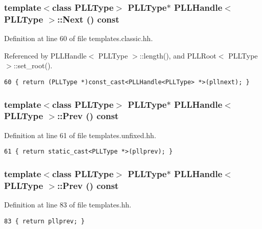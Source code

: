 \subsubsection{\setlength{\rightskip}{0pt plus 5cm}template$<$class PLLType$>$ {\bf PLLType}$\ast$ PLLHandle$<$ {\bf PLLType} $>$::Next () const\hspace{0.3cm}{\tt  [inline]}}\label{classPLLHandle_a1}




Definition at line 60 of file templates.classic.hh.

Referenced by PLLHandle$<$ PLLType $>$::length(), and PLLRoot$<$ PLLType $>$::set\_\-root().



\footnotesize\begin{verbatim}60 { return (PLLType *)const_cast<PLLHandle<PLLType> *>(pllnext); } 
\end{verbatim}\normalsize 
{}
\subsubsection{\setlength{\rightskip}{0pt plus 5cm}template$<$class PLLType$>$ {\bf PLLType}$\ast$ PLLHandle$<$ {\bf PLLType} $>$::Prev () const\hspace{0.3cm}{\tt  [inline]}}\label{classPLLHandle_a41}




Definition at line 61 of file templates.unfixed.hh.



\footnotesize\begin{verbatim}61 { return static_cast<PLLType *>(pllprev); } 
\end{verbatim}\normalsize 
{}
\subsubsection{\setlength{\rightskip}{0pt plus 5cm}template$<$class PLLType$>$ {\bf PLLType}$\ast$ PLLHandle$<$ {\bf PLLType} $>$::Prev () const\hspace{0.3cm}{\tt  [inline]}}\label{classPLLHandle_a28}




Definition at line 83 of file templates.hh.



\footnotesize\begin{verbatim}83 { return pllprev; } 
\end{verbatim}\normalsize 
{}
